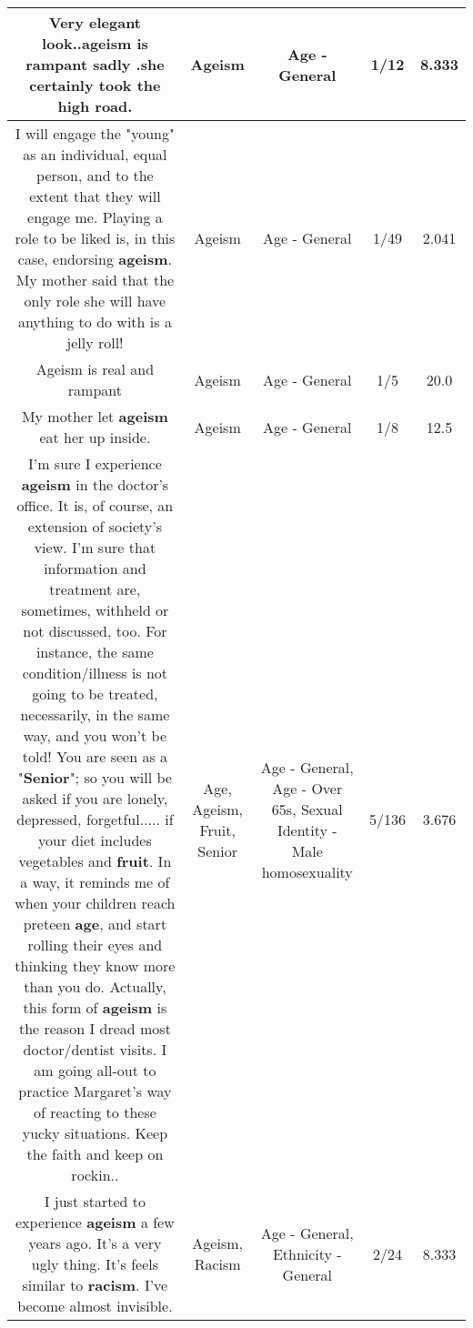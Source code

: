 \documentclass[11pt]{article}
\newlength\mylength
\begin{document}
\begin{center}
\begin{longtable}{|C{.65\mylength}|C{.30\mylength}|C{.12\mylength}|C{.12\mylength}|C{.12\mylength}|}
  \small Very elegant look..\textbf{ageism} is rampant sadly  .she certainly took the high road.\normalsize   & Ageism & Age - General & 1/12 & 8.333 \\  \hline
  \small I will engage the "young" as an individual,  equal person,  and to the extent that they will engage me.  Playing a role to be liked is, in this case, endorsing \textbf{ageism}.  My mother said that the only role she will have anything to do with is a jelly roll!\normalsize   & Ageism & Age - General & 1/49 & 2.041 \\  \hline
  \small Ageism is real and rampant\normalsize   & Ageism & Age - General & 1/5 & 20.0 \\  \hline
  \small My mother let \textbf{ageism} eat her up inside.\normalsize   & Ageism & Age - General & 1/8 & 12.5 \\  \hline
  \small I'm sure I experience \textbf{ageism} in the doctor's office.  It is,  of course,  an extension of society's view.  I'm sure that information and treatment are,  sometimes,  withheld or not discussed,  too.  For instance,  the same condition/illness is not going to be treated,  necessarily,  in the same way,  and you won't be told! You are seen as a "\textbf{Senior}"; so you will be asked if you are lonely,  depressed,  forgetful..... if your diet includes vegetables and \textbf{fruit}.  In a way,  it reminds me of when your children reach preteen \textbf{age},  and start rolling their eyes and thinking they know more than you do. Actually,  this form of \textbf{ageism} is the reason I dread most doctor/dentist visits.  I am going all-out to practice Margaret's way of reacting to these yucky situations. Keep the faith and keep on rockin..\normalsize   & Age, Ageism, Fruit, Senior & Age - General, Age - Over 65s, Sexual Identity - Male homosexuality & 5/136 & 3.676 \\  \hline
  \small I just started to experience \textbf{ageism} a few years ago. It's a very ugly thing. It's feels similar to \textbf{racism}. I've become almost invisible.\normalsize   & Ageism, Racism & Age - General, Ethnicity - General & 2/24 & 8.333 \\  \hline

\end{longtable}
\end{center}
\end{document}
